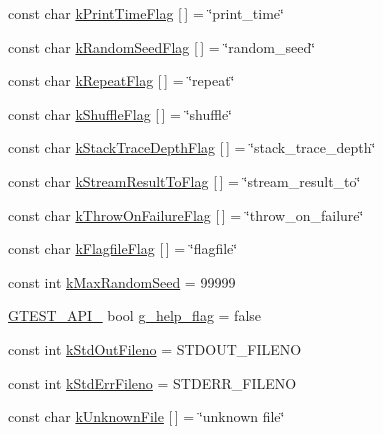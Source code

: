 \begin{DoxyCompactItemize}
\item 
const char \hyperlink{namespacetesting_1_1internal_aa6c13109bb4c78740ddb082b1ec0de56}{k\+Print\+Time\+Flag} \mbox{[}$\,$\mbox{]} = \char`\"{}print\+\_\+time\char`\"{}
\item 
const char \hyperlink{namespacetesting_1_1internal_a964ad71443cfda304b3208bf5d2daa75}{k\+Random\+Seed\+Flag} \mbox{[}$\,$\mbox{]} = \char`\"{}random\+\_\+seed\char`\"{}
\item 
const char \hyperlink{namespacetesting_1_1internal_a764ee423d39ebb8e10c53ab9b685cd9b}{k\+Repeat\+Flag} \mbox{[}$\,$\mbox{]} = \char`\"{}repeat\char`\"{}
\item 
const char \hyperlink{namespacetesting_1_1internal_affd2c1118505cb97d8ff728c95fc722b}{k\+Shuffle\+Flag} \mbox{[}$\,$\mbox{]} = \char`\"{}shuffle\char`\"{}
\item 
const char \hyperlink{namespacetesting_1_1internal_ad6f90e66d431ca3a9084408878c2cc77}{k\+Stack\+Trace\+Depth\+Flag} \mbox{[}$\,$\mbox{]} = \char`\"{}stack\+\_\+trace\+\_\+depth\char`\"{}
\item 
const char \hyperlink{namespacetesting_1_1internal_a84f8a2102d45c8b2b35be06d14ffefb8}{k\+Stream\+Result\+To\+Flag} \mbox{[}$\,$\mbox{]} = \char`\"{}stream\+\_\+result\+\_\+to\char`\"{}
\item 
const char \hyperlink{namespacetesting_1_1internal_ad9efcf363de3483afd91c7393a4fefb8}{k\+Throw\+On\+Failure\+Flag} \mbox{[}$\,$\mbox{]} = \char`\"{}throw\+\_\+on\+\_\+failure\char`\"{}
\item 
const char \hyperlink{namespacetesting_1_1internal_aa1ffe15dea227d4dded912e43a8eed84}{k\+Flagfile\+Flag} \mbox{[}$\,$\mbox{]} = \char`\"{}flagfile\char`\"{}
\item 
const int \hyperlink{namespacetesting_1_1internal_a41bd421ace53d23dbe85d9618c3afaee}{k\+Max\+Random\+Seed} = 99999
\item 
\hyperlink{gtest-port_8h_aa73be6f0ba4a7456180a94904ce17790}{G\+T\+E\+S\+T\+\_\+\+A\+P\+I\+\_\+} bool \hyperlink{namespacetesting_1_1internal_a93a772f5e51973b105d91cbb66a203f4}{g\+\_\+help\+\_\+flag} = false
\item 
const int \hyperlink{namespacetesting_1_1internal_a24f0a3d50cac54a9132f4828ec9b96d9}{k\+Std\+Out\+Fileno} = S\+T\+D\+O\+U\+T\+\_\+\+F\+I\+L\+E\+NO
\item 
const int \hyperlink{namespacetesting_1_1internal_a747eccfdbdee3ff8af3bedc476a57c85}{k\+Std\+Err\+Fileno} = S\+T\+D\+E\+R\+R\+\_\+\+F\+I\+L\+E\+NO
\item 
const char \hyperlink{namespacetesting_1_1internal_abae7a5775c901f2fd12b058b00d09840}{k\+Unknown\+File} \mbox{[}$\,$\mbox{]} = \char`\"{}unknown file\char`\"{}

\end{DoxyCompactItemize}
